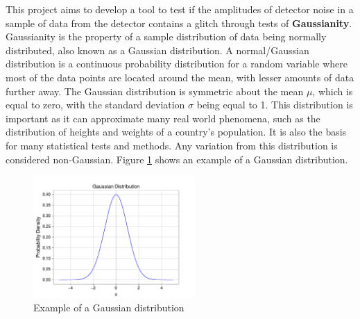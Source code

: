 \documentclass[12pt]{article}
\begin{document}
\medskip
\noindent This project aims to develop a tool to test if the amplitudes of detector noise in a sample of data from the detector contains a glitch through tests of \textbf{Gaussianity}. Gaussianity is the property of a sample distribution of data being normally distributed, also known as a Gaussian distribution. A normal/Gaussian distribution is a continuous probability distribution for a random variable where most of the data points are located around the mean, with lesser amounts of data further away. The Gaussian distribution is symmetric about the mean $\mu$, which is equal to zero, with the standard deviation $\sigma$ being equal to 1. This distribution is important as it can approximate many real world phenomena, such as the distribution of heights and weights of a country's population. It is also the basis for many statistical tests and methods. Any variation from this distribution is considered non-Gaussian. Figure \ref{fig:gaussian_distribution} shows an example of a Gaussian distribution.

\begin{figure}[H]
    \centering
    \includegraphics[width=0.55\textwidth]{images/gaussian_distribution.pdf}
    \caption{Example of a Gaussian distribution}
    \label{fig:gaussian_distribution}
\end{figure}



\end{document}
